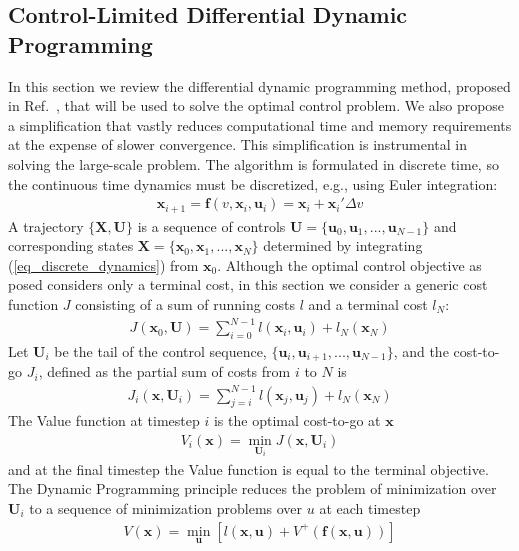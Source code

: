\documentclass[journal ]{new-aiaa}
\newcommand{\state}{\ensuremath{\mathbf{x}}}
\newcommand{\control}{\ensuremath{\mathbf{u}}}
\newcommand{\State}{\ensuremath{\mathbf{X}}}
\newcommand{\Control}{\ensuremath{\mathbf{U}}}
\begin{document}
\subsection*{Control-Limited Differential Dynamic Programming}
In this section we review the differential dynamic programming method, proposed in Ref.~\cite{DDP_ControlLimited}, that will be used to solve the optimal control problem. We also propose a simplification that vastly reduces computational time and memory requirements at the expense of slower convergence. This simplification is instrumental in solving the large-scale problem.
The algorithm is formulated in discrete time, so the continuous time dynamics must be discretized, e.g., using Euler integration:
\begin{align}
\state_{i+1} = \mathbf{f}(v, \state_i,\control_i) = \state_i + \state_i'\Delta v \label{eq_discrete_dynamics}
\end{align}
A trajectory $\{\State,\Control\}$ is a sequence of controls $ \Control=\{\control_0,\control_1,...,\control_{N-1}\} $ and corresponding states $\State=\{\state_0,\state_1,...,\state_N\}$ determined by integrating (\ref{eq_discrete_dynamics}) from $\state_0$.
Although the optimal control objective as posed considers only a terminal cost, in this section we consider a generic cost function $J$ consisting of a sum of running costs $l$ and a terminal cost $l_N$:
\begin{align}
J(\state_0,\Control) = \sum_{i=0}^{N-1}l(\state_i,\control_i) + l_N(\state_N)
\end{align}
Let $\Control_i$ be the tail of the control sequence, $\{\control_i,\control_{i+1},...,\control_{N-1}\}$, and the cost-to-go $J_i$, defined as the partial sum of costs from $i$ to $N$ is
\begin{align}
J_i(\state,\Control_i) = \sum_{j=i}^{N-1}l(\state_j,\control_j) + l_N(\state_N)
\end{align}
The Value function at timestep $i$ is the optimal cost-to-go at \state
\begin{align}
V_i(\state) = \min_{\Control_i} J(\state, \Control_i)
\end{align}
and at the final timestep the Value function is equal to the terminal objective. The Dynamic Programming principle reduces the problem of minimization over $\Control_i$ to a sequence of minimization problems over $u$ at each timestep 
\begin{align}
V(\state) = \min_{\control}\left[l(\state,\control) + V^+(\mathbf{f}(\state,\control))\right] \label{eq_dynamic_programming}
\end{align}
\end{document}
